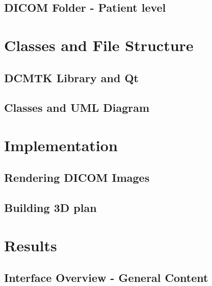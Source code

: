 \documentclass[11pt,twoside]{article}
\begin{document}
\clearpage
\subsection{DICOM Folder - Patient level}





\clearpage

\section{Classes and File Structure}

\subsection{DCMTK Library and Qt}


\clearpage
\subsection{Classes and UML Diagram}



\clearpage
\section{Implementation}

\subsection{Rendering DICOM Images}


\clearpage
\subsection{Building 3D plan}




\clearpage


\section{Results}

\subsection{Interface Overview - General Content}

\end{document}
